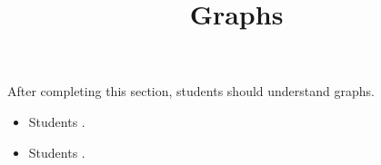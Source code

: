 \documentclass{ximera}
\title{Graphs}
\begin{document}
\begin{abstract}
\end{abstract}

\maketitle

\begin{sectionOutcomes}

After completing this section, students should understand graphs. 

\begin{itemize}
\item Students .
\item Students .
\end{itemize}

\end{sectionOutcomes}
\end{document}
